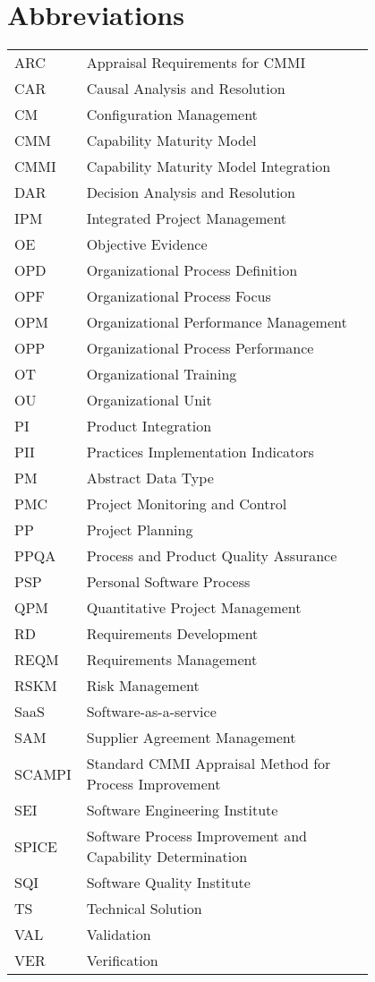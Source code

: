 \chapter*{Abbreviations}

\begin{flushleft}
	\begin{tabular}{l p{0.8\linewidth}}
		ARC & Appraisal Requirements for CMMI\\
		CAR & Causal Analysis and Resolution\\
		CM & Configuration Management\\
		CMM & Capability Maturity Model\\
		CMMI & Capability Maturity Model Integration\\
		DAR & Decision Analysis and Resolution\\
		IPM & Integrated Project Management\\
		OE & Objective Evidence\\
		OPD & Organizational Process Definition\\
		OPF & Organizational Process Focus\\
		OPM & Organizational Performance Management\\
		OPP & Organizational Process Performance\\
		OT & Organizational Training\\
		OU & Organizational Unit\\
		PI & Product Integration\\
		PII & Practices Implementation Indicators\\
		PM & Abstract Data Type\\
		PMC & Project Monitoring and Control\\
		PP & Project Planning\\
		PPQA & Process and Product Quality Assurance\\
		PSP & Personal Software Process\\
		QPM & Quantitative Project Management\\
		RD & Requirements Development\\
		REQM & Requirements Management\\
		RSKM & Risk Management\\
		SaaS & Software-as-a-service\\
		SAM & Supplier Agreement Management\\
		SCAMPI & Standard CMMI Appraisal Method for Process Improvement\\
		SEI & Software Engineering Institute\\
		SPICE & Software Process Improvement and Capability Determination\\
		SQI & Software Quality Institute\\
		TS & Technical Solution\\
		VAL & Validation\\
		VER & Verification\\
	\end{tabular}
\end{flushleft}